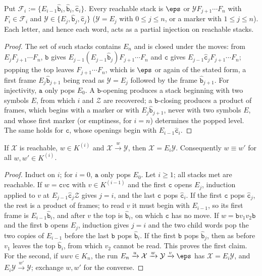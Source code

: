 \begin{lemma}\label{lem:app-tl-reachable}
Put $\mathcal F_i:=\{E_{i-1}\hat{\mathtt b}_i,\hat{\mathtt b}_i,\hat{\mathtt c}_i\}$.
Every reachable stack is $\eps$ or $\mathcal YF_{j+1}\cdots F_n$ with
$F_i\in\mathcal F_i$ and $\mathcal Y\in\{E_j,\hat{\mathtt b}_j,\hat{\mathtt c}_j\}$
($\mathcal Y=E_j$ with $0\le j\le n$, or a marker with $1\le j\le n$).  Each
letter, and hence each word, acts as a partial injection on reachable stacks.
\end{lemma}

\begin{proof}
The set of such stacks contains $E_n$ and is closed under the moves: from
$E_jF_{j+1}\cdots F_n$, $\mathtt b$ gives $E_{j-1}(E_{j-1}\hat{\mathtt b}_j)F_{j+1}\cdots F_n$
and $\mathtt c$ gives $E_{j-1}\hat{\mathtt c}_jF_{j+1}\cdots F_n$; popping the top
leaves $F_{j+1}\cdots F_n$, which is $\eps$ or again of the stated form, a first
frame $E_j\hat{\mathtt b}_{j+1}$ being read as $\mathcal Y=E_j$ followed by the frame
$\hat{\mathtt b}_{j+1}$.  For injectivity, $\mathtt a$ only pops $E_0$.  A
$\mathtt b$-opening produces a stack beginning with two symbols $E$, from which
$i$ and $\mathcal Z$ are recovered; a $\mathtt b$-closing produces a product of
frames, which begins with a marker or with $E_j\hat{\mathtt b}_{j+1}$, never with two
symbols $E$, and whose first marker (or emptiness, for $i=n$) determines the
popped level.  The same holds for $\mathtt c$, whose openings begin with
$E_{i-1}\hat{\mathtt c}_i$.
\end{proof}

\begin{lemma}\label{lem:app-tl-recognition}
If $\mathcal X$ is reachable, $w\in K^{(i)}$ and $\mathcal X\xrightarrow{w}\mathcal Y$, then
$\mathcal X=E_i\mathcal Y$.  Consequently $w\equiv w'$ for all $w,w'\in K^{(i)}$.
\end{lemma}

\begin{proof}
Induct on $i$; for $i=0$, $\mathtt a$ only pops $E_0$.  Let $i\ge1$; all stacks
met are reachable.  If $w=\mathtt cv\mathtt c$ with $v\in K^{(i-1)}$ and the first
$\mathtt c$ opens $E_j$, induction applied to $v$ at $E_{j-1}\hat{\mathtt c}_j\mathcal Z$
gives $j=i$, and the last $\mathtt c$ pops $\hat{\mathtt c}_i$.  If the first
$\mathtt c$ pops $\hat{\mathtt c}_j$, the rest is a product of frames; to read $v$ it
must begin with $E_{i-1}$, so its first frame is $E_{i-1}\hat{\mathtt b}_i$, and after
$v$ the top is $\hat{\mathtt b}_i$, on which $\mathtt c$ has no move.  If
$w=\mathtt bv_1v_2\mathtt b$ and the first $\mathtt b$ opens $E_j$, induction gives
$j=i$ and the two child words pop the two copies of $E_{i-1}$ before the last
$\mathtt b$ pops $\hat{\mathtt b}_i$.  If the first $\mathtt b$ pops $\hat{\mathtt b}_j$,
then as before $v_1$ leaves the top $\hat{\mathtt b}_i$, from which $v_2$ cannot be
read.  This proves the first claim.  For the second, if $uwv\in K_n$, the run
$E_n\xrightarrow{u}\mathcal X\xrightarrow{w}\mathcal Y\xrightarrow{v}\eps$ has
$\mathcal X=E_i\mathcal Y$, and $E_i\mathcal Y\xrightarrow{w'}\mathcal Y$; exchange $w,w'$
for the converse.
\end{proof}

